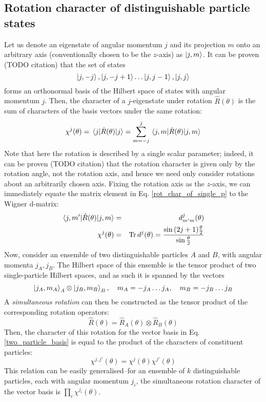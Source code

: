 \documentclass[12pt]{article}
\begin{document}
	\subsection{Rotation character of distinguishable particle states}
	Let us denote an eigenstate of angular momentum $j$ and its projection $m$ onto an arbitrary axis (conventionally chosen to be the $z$-axis) as $\ket{j, m}$. It can be proven (TODO citation) that the set of states
	$$\ket{j, -j}, \ket{j, -j+1} \dots \ket{j, j-1}, \ket{j, j}$$
	forms an orthonormal basis of the Hilbert space of states with angular momentum $j$. Then, the character of a $j$-eigenstate under rotation $\hat{R}(\theta)$ is the sum of characters of the basis vectors under the same rotation:
	\begin{equation} \label{rot_char_of_single_p}
	\chi^j(\theta)=\mel{j}{\hat{R}(\theta)}{j}=\sum_{m=-j}^j \mel{j, m}{\hat{R}(\theta)}{j, m}
	\end{equation}
	Note that here the rotation is described by a single scalar parameter; indeed, it can be proven (TODO citation) that the rotation character is given only by the rotation angle, not the rotation axis, and hence we need only consider rotations about an arbitrarily chosen axis. Fixing the rotation axis as the $z$-axis, we can immediately equate the matrix element in Eq. \ref{rot_char_of_single_p} to the Wigner d-matrix:
	\begin{eqnarray}
	\mel{j, m'}{\hat{R}(\theta)}{j, m} &=& d^j_{m'm}(\theta)\\
	\chi^j(\theta)&=&\Tr d^j(\theta) = \frac{\sin{(2j+1)\frac{\theta}{2}}}{\sin{\frac{\theta}{2}}}
	\end{eqnarray}
	Now, consider an ensemble of two distinguishable particles $A$ and $B$, with angular momenta $j_A, j_B$. The Hilbert space of this ensemble is the tensor product of two single-particle Hilbert spaces, and as such it is spanned by the vectors
	\begin{equation} \label{two_particle_basis}
	\ket{j_A, m_A}_A\otimes\ket{j_B, m_B}_B, \quad m_A = -j_A \dots j_A, \quad m_B = -j_B \dots j_B
	\end{equation}
	A \textit{simultaneous rotation} can then be constructed as the tensor product of the corresponding rotation operators:
	$$\hat{R}(\theta)=\hat{R}_A(\theta)\otimes\hat{R}_B(\theta)$$
	Then, the character of this rotation for the vector basis in Eq. \ref{two_particle_basis} is equal to the product of the characters of constituent particles:
	\begin{equation}
	\chi^{j,j'}(\theta)=\chi^j(\theta)\chi^{j'}(\theta)
	\end{equation}
	This relation can be easily generalised--for an ensemble of $k$ distinguishable particles, each with angular momentum $j_i$, the simultaneous rotation character of the vector basis is $\prod_{i}\chi^{j_i}(\theta)$.
	
\end{document}
